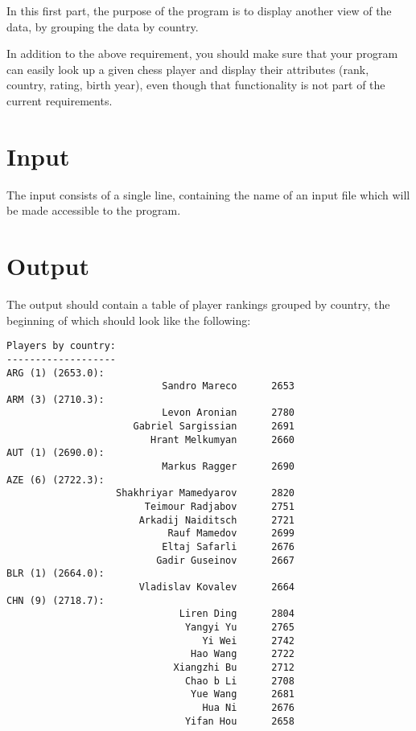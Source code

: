 
In this first part, the purpose of the program is to display another view of the data,
by grouping the data by country.

In addition to the above requirement,
you should make sure that your program can easily look up a given chess player
and display their attributes (rank, country, rating, birth year),
even though that functionality is not part of the current requirements.


\section*{Input}

The input consists of a single line,
containing the name of an input file
which will be made accessible to the program.


\section*{Output}

The output should contain
a table of player rankings grouped by country,
the beginning of which should look like the following:

\begin{verbatim}
Players by country:
-------------------
ARG (1) (2653.0):
                           Sandro Mareco      2653
ARM (3) (2710.3):
                           Levon Aronian      2780
                      Gabriel Sargissian      2691
                         Hrant Melkumyan      2660
AUT (1) (2690.0):
                           Markus Ragger      2690
AZE (6) (2722.3):
                   Shakhriyar Mamedyarov      2820
                        Teimour Radjabov      2751
                       Arkadij Naiditsch      2721
                            Rauf Mamedov      2699
                           Eltaj Safarli      2676
                          Gadir Guseinov      2667
BLR (1) (2664.0):
                       Vladislav Kovalev      2664
CHN (9) (2718.7):
                              Liren Ding      2804
                               Yangyi Yu      2765
                                  Yi Wei      2742
                                Hao Wang      2722
                             Xiangzhi Bu      2712
                               Chao b Li      2708
                                Yue Wang      2681
                                  Hua Ni      2676
                               Yifan Hou      2658
\end{verbatim}

